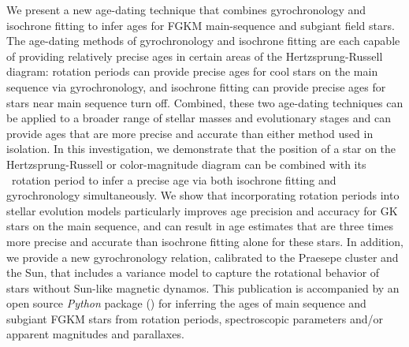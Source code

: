 We present a new age-dating technique that combines gyrochronology and
isochrone fitting to infer ages for FGKM main-sequence and subgiant field
stars.
The age-dating methods of gyrochronology and isochrone fitting are each
capable of providing relatively precise ages in certain areas of the
Hertzsprung-Russell diagram: rotation periods can provide precise ages for
cool stars on the main sequence via gyrochronology, and isochrone fitting
can provide precise ages for stars near main sequence turn off.
Combined, these two age-dating techniques can be applied to a broader range of
stellar masses and evolutionary stages and can provide ages that are more
precise and accurate than either method used in isolation.
In this investigation, we demonstrate that the position of a star on the
Hertzsprung-Russell or color-magnitude diagram can be combined with its
\kepler\ rotation period to infer a precise age via both isochrone fitting
and gyrochronology simultaneously.
We show that incorporating rotation periods into stellar evolution models
particularly improves age precision and accuracy for GK stars on the main
sequence, and can result in age estimates that are three times more precise
and accurate than isochrone fitting alone for these stars.
In addition, we provide a new gyrochronology relation, calibrated to the
Praesepe cluster and the Sun, that includes a variance model to capture the
rotational behavior of stars without Sun-like magnetic dynamos.
This publication is accompanied by an open source {\it Python} package (\sd)
for inferring the ages of main sequence and subgiant FGKM stars from rotation
periods, spectroscopic parameters and/or apparent magnitudes and parallaxes.
